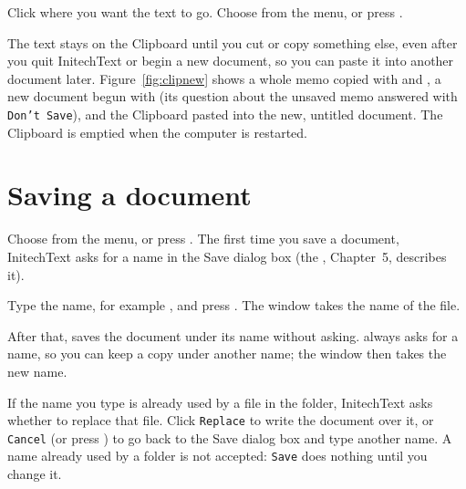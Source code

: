 
\begin{TaskSteps}[resume]
\Step Click where you want the text to go.
\Step Choose  from the  menu, or press
.
\end{TaskSteps}


The text stays on the Clipboard until you cut or copy something else, even
after you quit InitechText or begin a new document, so you can paste it
into another document later.  Figure~\ref{fig:clipnew} shows a whole memo
copied with  and , a new document begun
with  (its question about the unsaved memo answered with
\texttt{Don't Save}), and the Clipboard pasted into the new, untitled
document.  The Clipboard is emptied when the computer is restarted.


\section{Saving a document}
Choose  from the  menu, or press
.  The first time you save a document, InitechText asks for a
name in the Save dialog box (the , Chapter~5,
describes it).


Type the name, for example , and press .  The
window takes the name of the file.


After that,  saves the document under its name without
asking.   always asks for a name, so you can keep a
copy under another name; the window then takes the new name.

If the name you type is already used by a file in the folder, InitechText
asks whether to replace that file.  Click \texttt{Replace} to write the
document over it, or \texttt{Cancel} (or press ) to go back to the
Save dialog box and type another name.  A name already used by a folder is
not accepted: \texttt{Save} does nothing until you change it.


